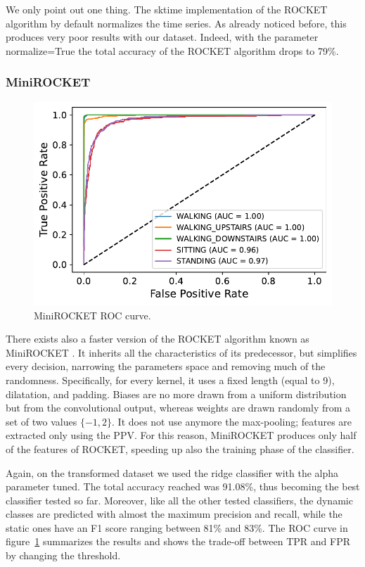 \documentclass[10pt, a4paper, twocolumn]{article}
\begin{document}
We only point out one thing.  The sktime implementation of the ROCKET algorithm by default normalizes the time series. As already noticed before, this produces very poor results with our dataset. Indeed, with the parameter normalize=True the total accuracy of the ROCKET algorithm drops to 79\%. 

\subsubsection*{MiniROCKET}

\begin{figure}
    \centering
    \includegraphics[width=0.6\linewidth]{immagini simone/output_204_0.pdf}
    \caption{MiniROCKET ROC curve.}
    \label{fig:minirocket_roc}
\end{figure} 

There exists also a faster version of the ROCKET algorithm known as MiniROCKET \parencite{minirocket:2021}. It inherits all the characteristics of its predecessor, but simplifies every decision, narrowing the parameters space and removing much of the randomness. Specifically, for every kernel, it uses a fixed length (equal to 9), dilatation, and padding. Biases are no more drawn from a uniform distribution but from the convolutional output, whereas weights are drawn randomly from a set of two values $\{-1,2\}$. It does not use anymore the max-pooling; features are extracted only using the PPV. For this reason, MiniROCKET produces only half of the features of ROCKET, speeding up also the training phase of the classifier.

Again, on the transformed dataset we used the ridge classifier with the alpha parameter tuned. The total accuracy reached was 91.08\%, thus becoming the best classifier tested so far. Moreover, like all the other tested classifiers, the dynamic classes are predicted with almost the maximum precision and recall, while the static ones have an F1 score ranging between 81\% and 83\%. The ROC curve in figure~\ref{fig:minirocket_roc} summarizes the results and shows the trade-off between TPR and FPR by changing the threshold. 
\end{document}
